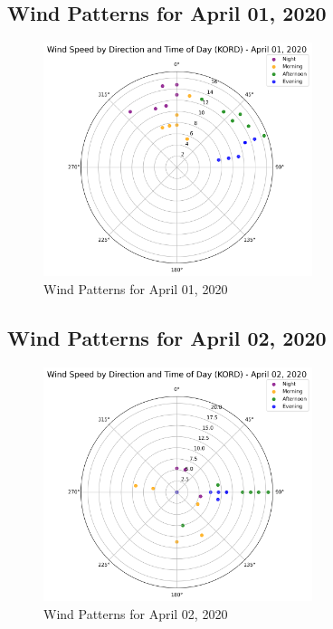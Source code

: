 \subsection{Wind Patterns for April 01, 2020}
\begin{figure}[htbp]
\centering
\includegraphics[width=0.7\textwidth]{wind_radar_plot_20200401.png}
\caption{Wind Patterns for April 01, 2020}
\label{fig:wind_20200401}
\end{figure}

\subsection{Wind Patterns for April 02, 2020}
\begin{figure}[htbp]
\centering
\includegraphics[width=0.7\textwidth]{wind_radar_plot_20200402.png}
\caption{Wind Patterns for April 02, 2020}
\label{fig:wind_20200402}
\end{figure}

